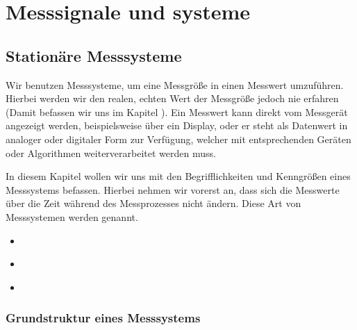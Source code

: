 \documentclass[letterpaper,10pt,english]{jupyterBook}
\begin{document}
\sphinxstepscope


\part{Messsignale und \sphinxhyphen{}systeme}

\sphinxstepscope


\chapter{Stationäre Messsysteme}
\label{\detokenize{content/2_Stationaer:stationare-messsysteme}}\label{\detokenize{content/2_Stationaer::doc}}
\sphinxAtStartPar
Wir benutzen Messsysteme, um eine Messgröße in einen Messwert umzuführen. Hierbei werden wir den realen, echten Wert der Messgröße jedoch nie erfahren (Damit befassen wir uns im Kapitel  {\hyperref[\detokenize{content/1_Messunsicherheiten::doc}]{}}).
Ein Messwert kann direkt vom Messgerät angezeigt werden, beispielsweise über ein Display, oder er steht als Datenwert in analoger oder digitaler Form zur Verfügung, welcher mit entsprechenden Geräten oder Algorithmen weiterverarbeitet werden muss.

\sphinxAtStartPar
In diesem Kapitel wollen wir uns mit den Begrifflichkeiten und Kenngrößen eines Messsystems befassen. Hierbei nehmen wir vorerst an, dass sich die Messwerte über die Zeit während des Messprozesses nicht ändern. Diese Art von Messsystemen werden  genannt.
\begin{itemize}
\item {} 
\sphinxAtStartPar
{\hyperref[\detokenize{content/2_Messsystem::doc}]{}}

\item {} 
\sphinxAtStartPar
{\hyperref[\detokenize{content/2_idealeKennlinie::doc}]{}}

\item {} 
\sphinxAtStartPar
{\hyperref[\detokenize{content/2_realeKennlinie::doc}]{}}

\end{itemize}

\sphinxstepscope


\section{Grundstruktur eines Messsystems}
\label{\detokenize{content/2_Messsystem:grundstruktur-eines-messsystems}}\label{\detokenize{content/2_Messsystem::doc}}
\sphinxAtStartPar
\end{document}
